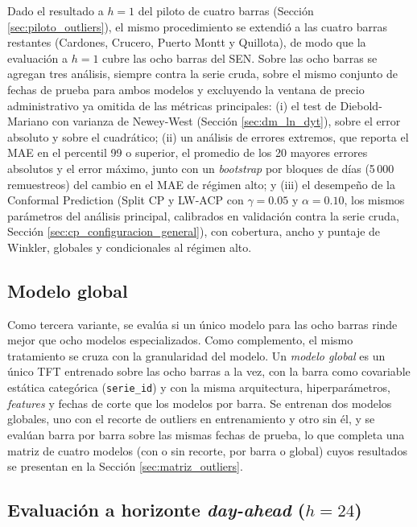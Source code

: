 Dado el resultado a $h=1$ del piloto de cuatro barras (Sección \ref{sec:piloto_outliers}), el mismo procedimiento se extendió a las cuatro barras restantes (Cardones, Crucero, Puerto Montt y Quillota), de modo que la evaluación a $h=1$ cubre las ocho barras del SEN. Sobre las ocho barras se agregan tres análisis, siempre contra la serie cruda, sobre el mismo conjunto de fechas de prueba para ambos modelos y excluyendo la ventana de precio administrativo ya omitida de las métricas principales: (i) el test de Diebold-Mariano con varianza de Newey-West (Sección \ref{sec:dm_ln_dyt}), sobre el error absoluto y sobre el cuadrático; (ii) un análisis de errores extremos, que reporta el MAE en el percentil 99 o superior, el promedio de los 20 mayores errores absolutos y el error máximo, junto con un \textit{bootstrap} por bloques de días (5\,000 remuestreos) del cambio en el MAE de régimen alto; y (iii) el desempeño de la Conformal Prediction (Split CP y LW-ACP con $\gamma=0.05$ y $\alpha=0.10$, los mismos parámetros del análisis principal, calibrados en validación contra la serie cruda, Sección \ref{sec:cp_configuracion_general}), con cobertura, ancho y puntaje de Winkler, globales y condicionales al régimen alto.

\subsection{Modelo global}
\label{sec:modelo_global_meta}

Como tercera variante, se evalúa si un único modelo para las ocho barras rinde mejor que ocho modelos especializados. Como complemento, el mismo tratamiento se cruza con la granularidad del modelo. Un \textit{modelo global} es un único TFT entrenado sobre las ocho barras a la vez, con la barra como covariable estática categórica (\texttt{serie\_id}) y con la misma arquitectura, hiperparámetros, \textit{features} y fechas de corte que los modelos por barra. Se entrenan dos modelos globales, uno con el recorte de outliers en entrenamiento y otro sin él, y se evalúan barra por barra sobre las mismas fechas de prueba, lo que completa una matriz de cuatro modelos (con o sin recorte, por barra o global) cuyos resultados se presentan en la Sección \ref{sec:matriz_outliers}.

\subsection{Evaluación a horizonte \textit{day-ahead} ($h=24$)}
\label{sec:h24_dayahead_meta}


